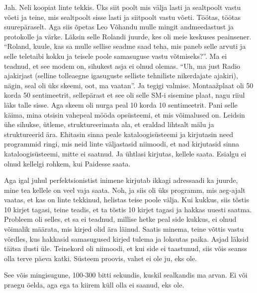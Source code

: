 
Jah. Neli koopiat linte tekkis. Üks siit poolt mis välja lasti ja sealtpoolt vastu võeti ja teine, mis sealtpoolt sisse lasti ja siitpoolt vastu võeti. Töötas, töötas suurepäraselt. Aga siis õpetas Leo Võhandu mulle mingit andmeedastust ja protokolle ja värke. Läksin selle Rolandi juurde, kes oli meie keskuses peainsener. \enquote{Roland, kuule, kas sa mulle sellise seadme saad teha, mis paneb selle arvuti ja selle teletaibi kokku ja teisele poole samasuguse  vastu võtmiseks?}. Ma ei teadnud, et see modem on, sihukest asja ei olnud olemas. \enquote{Uh, ma just Radio ajakirjast (selline tolleaegne igasuguste selliste tehniliste nikerdajate ajakiri), nägin, seal oli üks skeemi, oot, ma vaatan}. Ja tegigi valmise. Montaažplaat oli 50 korda 50 sentimeetrit, sellepärast et see oli selle SM-i sisemine plaat, nagu riiul läks talle sisse. Aga skeem oli nurga peal 10 korda 10 sentimeetrit. Pani selle käima,  mina otsisin vahepeal mööda opsüsteemi, et mis võimalused on. Leidsin ühe sihukse, ütleme, struktureerimata ala, et eraldad lihtsalt mälu ja struktureerid ära. Ehitasin sinna peale kataloogisüsteemi ja kirjutasin need programmid ringi, mis neid linte väljastasid niimoodi, et nad kirjutasid sinna kataloogisüsteemi, mitte ei saatnud. Ja ühtlasi kirjutas, kellele saata. Esialgu ei olnud kellelgi rohkem, kui  Paidesse saata. 

Aga igal juhul perfektsionistist inimene kirjutab ikkagi adressaadi ka juurde, mine tea kellele on veel vaja saata. Noh, ja siis oli üks programm, mis aeg-ajalt vaatas, et kas on linte tekkinud, helistas teise poole välja. Kui kukkus, siis tõstis 10 kirjet tagasi, teine teadis, et ta tõstis 10 kirjet tagasi ja hakkas uuesti saatma. Probleem oli selles, et sa ei teadnud, millise hetke peal side kukkus, ei olnud võimalik määrata, mis kirjed olid ära läinud. Saatis minema, teine võttis vastu võrdles, kus hakkasid samasugused kirjed tulema ja loksutas paika. Asjad läksid täitsa ilusti üle. Teinekord oli niimoodi, et kui side ei taastunud, siis võis seanss olla terve päeva katki. Süsteem proovis, vahet ei ole ju, eks ole.


See võis mingisugune, 100-300 bitti sekundis, kuskil sealkandis ma arvan. Ei või praegu öelda, aga ega ta kiirem küll olla ei saanud, eks ole. 

